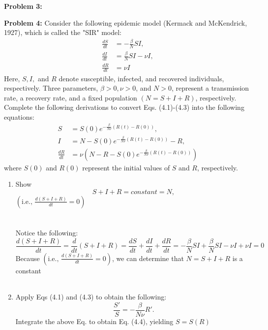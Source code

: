 \documentclass[11pt]{article}
\newenvironment{problem}[1]{\textbf{Problem #1: }}{\newpage}
\begin{document}
\begin{problem}{3}
\begin{enumerate}[label = (\alph*)]
			
			
		
		\end{enumerate}
	\end{problem}

	\begin{problem}{4}
		Consider the following epidemic model (Kermack and McKendrick, 1927), which is called the "SIR" model:
		\begin{align*}
			\frac{dS}{dt} &= - \frac{\beta}{N}SI, \tag{4.1} \\
			\frac{dI}{dt} &= \frac{\beta}{N}SI - \nu I, \tag{4.2} \\
			\frac{dR}{dt} &= \nu I \tag{4.3}
		\end{align*}
		Here, $S, I,$ and $R$ denote susceptible, infected, and recovered individuals,
		respectively. Three parameters, $\beta > 0, \nu > 0$, and $N > 0$, represent a
		transmission rate, a recovery rate, and a fixed population $(N = S + I + R)$,
		respectively. Complete the following derivations to convert Eqs. (4.1)-(4.3)
		into the following equations:
		\begin{align*}
			S &= S(0)e^{-\frac{\beta}{N \nu}(R(t) - R(0))}, \tag{4.4} \\
			I &= N  - S(0)e^{-\frac{\beta}{N \nu}(R(t) - R(0))} - R, \tag{4.5} \\
			\frac{dR}{dt} &= \nu \left(N  - R - S(0)e^{-\frac{\beta}{N \nu}(R(t) - R(0))}\right) \tag{4.6}
		\end{align*}
		where $S(0)$ and $R(0)$ represent the initial values of $S$ and $R$, respectively.
		\newpage
		\begin{enumerate}[label = (\alph*)]
			\item Show
			\[S + I + R = constant = N, \tag{4.7}\]
			$\left(\text{i.e., } \frac{d(S + I + R)}{dt} = 0\right)$
			\\ \\ \\
			Notice the following:
			\[\frac{d(S + I + R)}{dt} = \frac{d}{dt}\left(S+I+R\right) = \frac{dS}{dt} +\frac{dI}{dt} + \frac{dR}{dt} =  - \frac{\beta}{N}SI + \frac{\beta}{N}SI - \nu I + \nu I = 0 \]
			Because $\left(\text{i.e., } \frac{d(S + I + R)}{dt} = 0\right)$, we can determine that $N = S + I + R$ is a constant
			\\ \\
			\item Apply Eqs (4.1) and (4.3) to obtain the following:
			\[\frac{S'}{S} = -\frac{\beta}{N \nu}R'.\]
			Integrate the above Eq. to obtain Eq. (4.4), yielding $S = S(R)$
			\\ \\ \\

\end{enumerate}
\end{problem}
\end{document}
